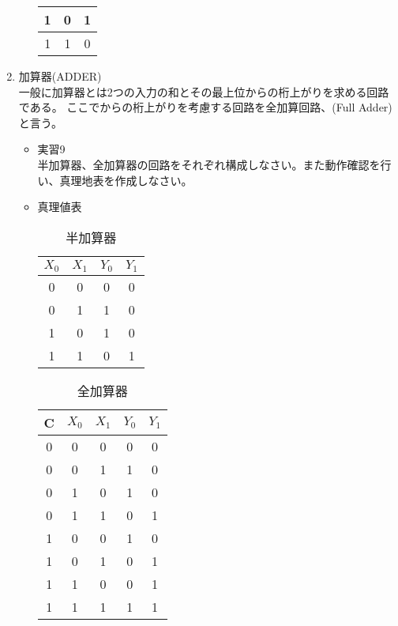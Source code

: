\documentclass[dvipdfmx,a4paper]{jsarticle}
\begin{document}
\begin{enumerate}
\begin{itemize}
\begin{table}[H]
\begin{tabular}{|c|c|c|}
										1 & 0 & 1\\ \hline
										1 & 1 & 0\\ \hline
									\end{tabular}
								\end{table}
						\end{itemize}
					\item 加算器(ADDER) \\
						一般に加算器とは2つの入力の和とその最上位からの桁上がりを求める回路である。
						ここでからの桁上がりを考慮する回路を全加算回路、(Full Adder)と言う。
						\begin{itemize}
							\item 実習9\\
							半加算器、全加算器の回路をそれぞれ構成しなさい。また動作確認を行い、真理地表を作成しなさい。
							\item 真理値表
								\begin{table}[H]
									\center
									\caption{半加算器\label{tb:half-adder}}
									\begin{tabular}{|c|c|c|c|}
										\hline
										$X_0$ & $X_1$ & $Y_0$ &$Y_1$ \\ \hline
										0 & 0 & 0 & 0 \\ \hline
										0 & 1 & 1 & 0\\ \hline
										1 & 0 & 1 & 0\\ \hline
										1 & 1 & 0 & 1\\ \hline
									\end{tabular}
								\end{table}
								\begin{table}[H]
									\center
									\caption{全加算器\label{tb:full-adder}}
									\begin{tabular}{|c|c|c|c|c|}
										\hline
										C & $X_0$ & $X_1$ & $Y_0$ &$Y_1$ \\ \hline
										0 & 0 & 0 & 0 & 0 \\ \hline
										0 & 0 & 1 & 1 & 0\\ \hline
										0 & 1 & 0 & 1 & 0\\ \hline
										0 & 1 & 1 & 0 & 1\\ \hline
										1 & 0 & 0 & 1 & 0 \\ \hline
										1 & 0 & 1 & 0 & 1\\ \hline
										1 & 1 & 0 & 0 & 1\\ \hline
										1 & 1 & 1 & 1 & 1\\ \hline
									\end{tabular}

\end{table}
\end{itemize}
\end{enumerate}
\end{document}
